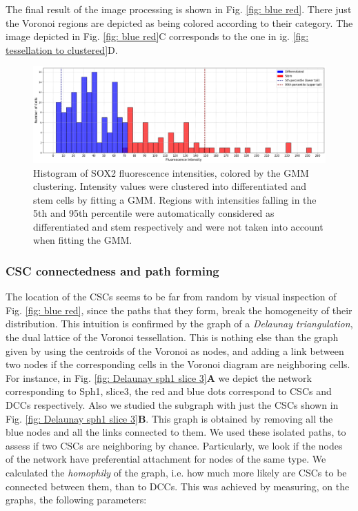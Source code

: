 \documentclass[fleqn,10pt]{wlscirep}
\begin{document}
The final result of the image processing is shown in Fig. \ref{fig: blue red}. There just the Voronoi regions are depicted as being colored according to their category. The image depicted in Fig. \ref{fig: blue red}C corresponds to the one in ig. \ref{fig: tessellation to clustered}D. 


\begin{figure}
    \centering
    \includegraphics[width=1.0\textwidth]{images/sph1_slice3/histogram_GMM_clustering_cutting_tails_in_sph_NEW.png}
    \caption{Histogram of SOX2 fluorescence intensities, colored by the GMM clustering. Intensity values were clustered into differentiated and stem cells by fitting a GMM. Regions with intensities falling in the 5th  and  95th percentile were automatically considered as differentiated and stem respectively and were not taken into account when fitting the GMM.}
    \label{fig: filtered GMM histogram}
\end{figure}


\subsubsection*{CSC connectedness and path forming} \label{sss: csc connectedness}
The location of the CSCs seems to be far from random by visual inspection of Fig. \ref{fig: blue red}, since the paths that they form, break the homogeneity of their distribution. This intuition is confirmed by the graph of a \emph{Delaunay triangulation}, the dual lattice of the Voronoi tessellation. This is nothing else than the graph given by using the centroids of the Voronoi as nodes, and adding a link between two nodes if the corresponding cells in the Voronoi diagram are neighboring cells. For instance, in Fig. \ref{fig: Delaunay sph1 slice 3}{\bf A} we depict the network corresponding to {\textsf Sph1, slice3}, the red and blue dots correspond to CSCs and DCCs respectively. Also we studied the subgraph with just the CSCs shown in Fig. \ref{fig: Delaunay sph1 slice 3}{\bf B}. This graph is obtained by removing all the blue nodes and all the links connected to them. We used these isolated paths, to assess if two CSCs are neighboring by chance. Particularly, we look if the nodes of the network have preferential attachment for nodes of the same type. We calculated the \emph{homophily} of the graph, i.e. how much more likely are CSCs to be connected between them, than to DCCs. This was achieved by measuring, on the graphs, the following parameters:
\end{document}
